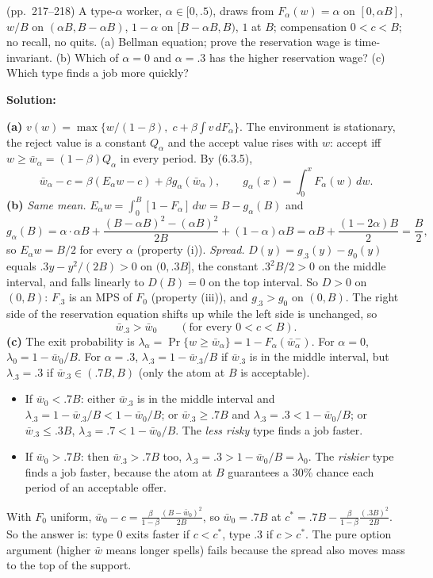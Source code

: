 \documentclass[12pt, letterpaper]{article}
\newcommand{\wb}{\bar w}
\begin{document}
\begin{tcolorbox}[evenbox,title={Exercise 6.20 \quad Offer Distributions with Atoms}]
\begin{tcolorbox}[questionbox]
(pp.~217--218) A type-$\alpha$ worker, $\alpha\in[0,.5)$, draws from $F_\alpha(w)=\alpha$ on $[0,\alpha B]$, $w/B$ on
$(\alpha B,B-\alpha B)$, $1-\alpha$ on $[B-\alpha B,B)$, $1$ at $B$; compensation $0<c<B$; no recall, no quits.
(a) Bellman equation; prove the reservation wage is time-invariant. (b) Which of $\alpha=0$ and
$\alpha=.3$ has the higher reservation wage? (c) Which type finds a job more quickly?
\end{tcolorbox}

\textbf{Solution:}

\textbf{(a)} $v(w)=\max\{w/(1-\beta),\;c+\beta\int v\,dF_\alpha\}$. The environment is stationary, the reject
value is a constant $Q_\alpha$ and the accept value rises with $w$: accept iff $w\ge\wb_\alpha=(1-\beta)Q_\alpha$ in
every period. By (6.3.5),
\[
\wb_\alpha-c=\beta(E_\alpha w-c)+\beta g_\alpha(\wb_\alpha),\qquad g_\alpha(x)=\int_0^xF_\alpha(w)\,dw .
\]
\textbf{(b)} \emph{Same mean.} $E_\alpha w=\int_0^B[1-F_\alpha]\,dw=B-g_\alpha(B)$ and
\[
g_\alpha(B)=\alpha\cdot\alpha B+\frac{(B-\alpha B)^2-(\alpha B)^2}{2B}+(1-\alpha)\alpha B
=\alpha B+\frac{(1-2\alpha)B}{2}=\frac B2,
\]
so $E_\alpha w=B/2$ for every $\alpha$ (property (i)).
\emph{Spread.} $D(y)=g_{.3}(y)-g_0(y)$ equals $.3y-y^2/(2B)>0$ on $(0,.3B]$, the constant
$.3^2B/2>0$ on the middle interval, and falls linearly to $D(B)=0$ on the top interval. So $D>0$ on
$(0,B)$: $F_{.3}$ is an MPS of $F_0$ (property (iii)), and $g_{.3}>g_0$ on $(0,B)$. The right side of the
reservation equation shifts up while the left side is unchanged, so
\[
\boxed{\wb_{.3}>\wb_0}\qquad(\text{for every }0<c<B).
\]
\textbf{(c)} The exit probability is $\lambda_\alpha=\Pr\{w\ge\wb_\alpha\}=1-F_\alpha(\wb_\alpha^-)$. For $\alpha=0$,
$\lambda_0=1-\wb_0/B$. For $\alpha=.3$, $\lambda_{.3}=1-\wb_{.3}/B$ if $\wb_{.3}$ is in the middle interval, but
$\lambda_{.3}=.3$ if $\wb_{.3}\in(.7B,B)$ (only the atom at $B$ is acceptable).
\begin{itemize}[itemsep=2pt]
\item If $\wb_0<.7B$: either $\wb_{.3}$ is in the middle interval and $\lambda_{.3}=1-\wb_{.3}/B<1-\wb_0/B$; or
$\wb_{.3}\ge.7B$ and $\lambda_{.3}=.3<1-\wb_0/B$; or $\wb_{.3}\le.3B$, $\lambda_{.3}=.7<1-\wb_0/B$. The
\emph{less risky} type finds a job faster.
\item If $\wb_0>.7B$: then $\wb_{.3}>.7B$ too, $\lambda_{.3}=.3>1-\wb_0/B=\lambda_0$. The \emph{riskier} type finds a job
faster, because the atom at $B$ guarantees a 30\% chance each period of an acceptable offer.
\end{itemize}
With $F_0$ uniform, $\wb_0-c=\frac{\beta}{1-\beta}\frac{(B-\wb_0)^2}{2B}$, so $\wb_0=.7B$ at
$c^*=.7B-\frac{\beta}{1-\beta}\frac{(.3B)^2}{2B}$. So the answer is: type $0$ exits faster if $c<c^*$, type $.3$ if
$c>c^*$. The pure option argument (higher $\wb$ means longer spells) fails because the spread also moves
mass to the top of the support.


\end{tcolorbox}
\end{document}
